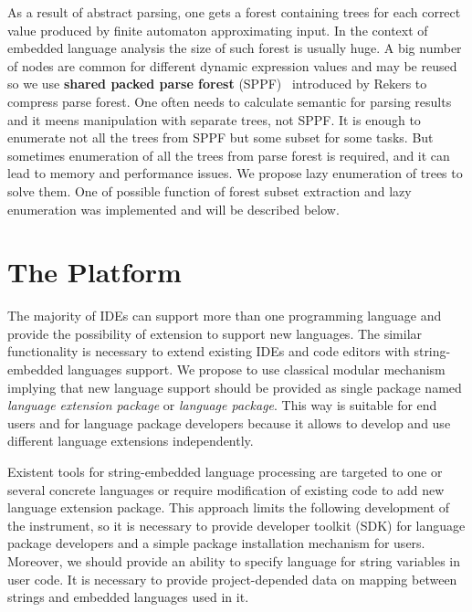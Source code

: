 \documentclass{acm_proc_article-sp}
\begin{document}
As a result of abstract parsing, one gets a forest containing trees for each correct value produced by finite automaton approximating input. In the context of embedded language analysis the size of such forest is usually huge. A big number of nodes are common for different dynamic expression values and may be reused so we use {\bf shared packed parse forest} (SPPF)~\cite{SPPF} introduced by Rekers to compress parse forest. One often needs to calculate semantic for parsing results and it meens manipulation with separate trees, not SPPF. It is enough to enumerate not all the trees from SPPF but some subset for some tasks. But sometimes enumeration of all the trees from parse forest is required, and it can lead to memory and performance issues. We propose lazy enumeration of trees to solve them. One of possible function of forest subset extraction and lazy enumeration was implemented and will be described below.


\section{The Platform}

The majority of IDEs can support more than one programming language and provide the possibility of extension to support new languages. The similar functionality is necessary to extend existing IDEs and code editors with string-embedded languages support. We propose to use classical modular mechanism implying that new language support should be provided as single package named {\it language extension package} or {\it language package}. This way is suitable for end users and for language package developers because it allows to develop and use different language extensions independently. 

Existent tools for string-embedded language processing are targeted to one or several concrete languages or require modification of existing code to add new language extension package. This approach limits the following development of the instrument, so it is necessary to provide developer toolkit (SDK) for language package developers and a simple package installation mechanism for users. Moreover, we should provide an ability to specify language for string variables in user code. It is necessary to provide project-depended data on mapping between strings and embedded languages used in it.
\end{document}

